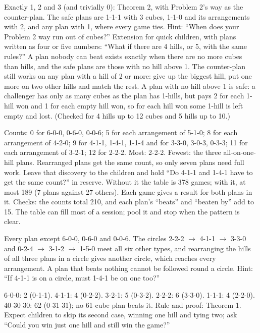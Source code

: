 Exactly 1, 2 and 3 (and trivially 0): Theorem 2, with Problem 2's way as the counter-plan. The safe plans are 1-1-1 with 3 cubes, 1-1-0 and its arrangements with 2, and any plan with 1, where every game ties. Hint: ``When does your Problem 2 way run out of cubes?'' Extension for quick children, with plans written as four or five numbers: ``What if there are 4 hills, or 5, with the same rules?'' A plan nobody can beat exists exactly when there are no more cubes than hills, and the safe plans are those with no hill above 1. The counter-plan still works on any plan with a hill of 2 or more: give up the biggest hill, put one more on two other hills and match the rest. A plan with no hill above 1 is safe: a challenger has only as many cubes as the plan has 1-hills, but pays 2 for each 1-hill won and 1 for each empty hill won, so for each hill won some 1-hill is left empty and lost. (Checked for 4 hills up to 12 cubes and 5 hills up to 10.)

Counts: 0 for 6-0-0, 0-6-0, 0-0-6; 5 for each arrangement of 5-1-0; 8 for each arrangement of 4-2-0; 9 for 4-1-1, 1-4-1, 1-1-4 and for 3-3-0, 3-0-3, 0-3-3; 11 for each arrangement of 3-2-1; 12 for 2-2-2. Most: 2-2-2. Fewest: the three all-on-one-hill plans. Rearranged plans get the same count, so only seven plans need full work. Leave that discovery to the children and hold ``Do 4-1-1 and 1-4-1 have to get the same count?'' in reserve. Without it the table is 378 games; with it, at most 189 (7 plans against 27 others). Each game gives a result for both plans in it. Checks: the counts total 210, and each plan's ``beats'' and ``beaten by'' add to 15. The table can fill most of a session; pool it and stop when the pattern is clear.

Every plan except 6-0-0, 0-6-0 and 0-0-6. The circles 2-2-2 $\to$ 4-1-1 $\to$ 3-3-0 and 0-2-4 $\to$ 3-1-2 $\to$ 1-5-0 meet all six other types, and rearranging the hills of all three plans in a circle gives another circle, which reaches every arrangement. A plan that beats nothing cannot be followed round a circle. Hint: ``If 4-1-1 is on a circle, must 1-4-1 be on one too?''

6-0-0: 2 (0-1-1). 4-1-1: 4 (0-2-2). 3-2-1: 5 (0-3-2). 2-2-2: 6 (3-3-0). 1-1-1: 4 (2-2-0). 40-30-30: 62 (0-31-31); no 61-cube plan beats it. Rule and proof: Theorem 1. Expect children to skip its second case, winning one hill and tying two; ask ``Could you win just one hill and still win the game?''

